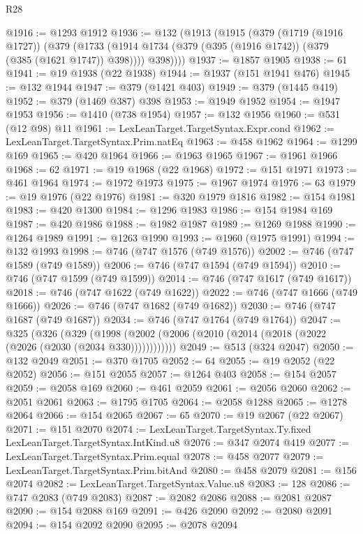 \begin{lexlean}{R28}
\begin{coremodule}
@1916 := @1293 @1912
@1936 := @132
    (@1913
      (@1915
        (@379
          (@1719 (@1916 @1727))
          (@379
            (@1733 (@1914 @1734 (@379 (@395 (@1916 @1742)) (@379 (@385 (@1621 @1747)) @398))))
            @398))))
@1937 := @1857 @1905
@1938 := 61
@1941 := @19 @1938 (@22 @1938)
@1944 := @1937 (@151 @1941 @476)
@1945 := @132 @1944
@1947 := @379 (@1421 @403)
@1949 := @379 (@1445 @419)
@1952 := @379 (@1469 @387) @398
@1953 := @1949 @1952
@1954 := @1947 @1953
@1956 := @1410 (@738 @1954)
@1957 := @132 @1956
@1960 := @531 (@12 @98) @11
@1961 := LexLeanTarget.TargetSyntax.Expr.cond
@1962 := LexLeanTarget.TargetSyntax.Prim.natEq
@1963 := @458 @1962
@1964 := @1299 @169
@1965 := @420 @1964
@1966 := @1963 @1965
@1967 := @1961 @1966
@1968 := 62
@1971 := @19 @1968 (@22 @1968)
@1972 := @151 @1971
@1973 := @461 @1964
@1974 := @1972 @1973
@1975 := @1967 @1974
@1976 := 63
@1979 := @19 @1976 (@22 @1976)
@1981 := @320 @1979 @1816
@1982 := @154 @1981
@1983 := @420 @1300
@1984 := @1296 @1983
@1986 := @154 @1984 @169
@1987 := @420 @1986
@1988 := @1982 @1987
@1989 := @1269 @1988
@1990 := @1264 @1989
@1991 := @1263 @1990
@1993 := @1960 (@1975 @1991)
@1994 := @132 @1993
@1998 := @746 (@747 @1576 (@749 @1576))
@2002 := @746 (@747 @1589 (@749 @1589))
@2006 := @746 (@747 @1594 (@749 @1594))
@2010 := @746 (@747 @1599 (@749 @1599))
@2014 := @746 (@747 @1617 (@749 @1617))
@2018 := @746 (@747 @1622 (@749 @1622))
@2022 := @746 (@747 @1666 (@749 @1666))
@2026 := @746 (@747 @1682 (@749 @1682))
@2030 := @746 (@747 @1687 (@749 @1687))
@2034 := @746 (@747 @1764 (@749 @1764))
@2047 := @325
    (@326
      (@329 (@1998 (@2002 (@2006 (@2010 (@2014 (@2018 (@2022 (@2026 (@2030 (@2034 @330))))))))))))
@2049 := @513 (@324 @2047)
@2050 := @132 @2049
@2051 := @370 @1705
@2052 := 64
@2055 := @19 @2052 (@22 @2052)
@2056 := @151 @2055
@2057 := @1264 @403
@2058 := @154 @2057
@2059 := @2058 @169
@2060 := @461 @2059
@2061 := @2056 @2060
@2062 := @2051 @2061
@2063 := @1795 @1705
@2064 := @2058 @1288
@2065 := @1278 @2064
@2066 := @154 @2065
@2067 := 65
@2070 := @19 @2067 (@22 @2067)
@2071 := @151 @2070
@2074 := LexLeanTarget.TargetSyntax.Ty.fixed LexLeanTarget.TargetSyntax.IntKind.u8
@2076 := @347 @2074 @419
@2077 := LexLeanTarget.TargetSyntax.Prim.equal
@2078 := @458 @2077
@2079 := LexLeanTarget.TargetSyntax.Prim.bitAnd
@2080 := @458 @2079
@2081 := @156 @2074
@2082 := LexLeanTarget.TargetSyntax.Value.u8
@2083 := 128
@2086 := @747 @2083 (@749 @2083)
@2087 := @2082 @2086
@2088 := @2081 @2087
@2090 := @154 @2088 @169
@2091 := @426 @2090
@2092 := @2080 @2091
@2094 := @154 @2092 @2090
@2095 := @2078 @2094

\end{coremodule}
\end{lexlean}

